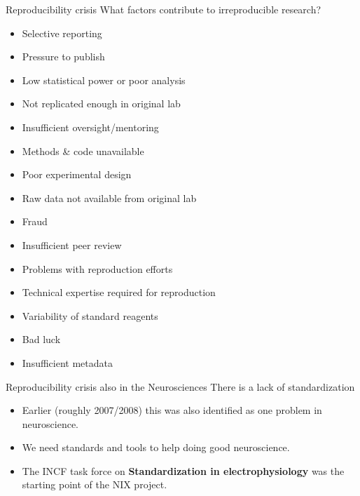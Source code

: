 \documentclass[pdftex]{beamer}
\begin{document}
\begin{frame}{Reproducibility crisis}
    What factors contribute to irreproducible research?
    \begin{itemize}
        \item <1-> Selective reporting
        \item <1-> Pressure to publish
        \item <1-> Low statistical power or poor analysis
        \item <1-> Not replicated enough in original lab
        \item <1-> Insufficient oversight/mentoring
        \item <1-> Methods \& code unavailable
        \item <1-> Poor experimental design
        \item <1-| alert@2> Raw data not available from original lab
        \item <1-> Fraud
        \item <1-> Insufficient peer review
        \item <1-> Problems with reproduction efforts
        \item <1-> Technical expertise required for reproduction
        \item <1-> Variability of standard reagents
        \item <1-> Bad luck
        \item <1-| alert@2> Insufficient metadata
    \end{itemize}
\end{frame}

\begin{frame}{Reproducibility crisis also in the Neurosciences}
    \large{There is a lack of standardization} \vspace{1ex}
    \begin{itemize}
        \item <1-> Earlier (roughly 2007/2008) this was also identified as one problem in neuroscience. \vspace{1ex}
        \item <2-> We need standards and tools to help doing good neuroscience.  \vspace{1ex}
        \item <3-> The INCF task force on \textbf{Standardization in electrophysiology} was the starting point of the NIX project.
    \end{itemize}
\end{frame}
\end{document}
